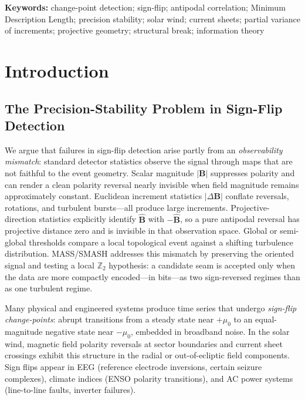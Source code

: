 \documentclass[12pt,letterpaper]{article}
\begin{document}
\textbf{Keywords:} change-point detection; sign-flip; antipodal correlation;
Minimum Description Length; precision stability; solar wind; current sheets;
partial variance of increments; projective geometry; structural break;
information theory

\clearpage

\section{Introduction}
\label{sec:intro}

\subsection{The Precision-Stability Problem in Sign-Flip Detection}

We argue that failures in sign-flip detection arise partly from an
\emph{observability mismatch}: standard detector statistics observe the
signal through maps that are not faithful to the event geometry.
Scalar magnitude $|\mathbf{B}|$ suppresses polarity and can render a clean
polarity reversal nearly invisible when field magnitude remains approximately
constant.
Euclidean increment statistics $|\Delta\mathbf{B}|$ conflate reversals,
rotations, and turbulent bursts---all produce large increments.
Projective-direction statistics explicitly identify $\hat{\mathbf{B}}$ with
$-\hat{\mathbf{B}}$, so a pure antipodal reversal has projective distance zero
and is invisible in that observation space.
Global or semi-global thresholds compare a local topological event against a
shifting turbulence distribution.
MASS/SMASH addresses this mismatch by preserving the oriented signal and
testing a local $\mathbb{Z}_2$ hypothesis: a candidate seam is accepted only
when the data are more compactly encoded---in bits---as two sign-reversed
regimes than as one turbulent regime.

Many physical and engineered systems produce time series that undergo
\emph{sign-flip change-points}: abrupt transitions from a steady state near
$+\mu_0$ to an equal-magnitude negative state near $-\mu_0$, embedded in
broadband noise.
In the solar wind, magnetic field polarity reversals at sector boundaries and
current sheet crossings exhibit this structure in the radial or out-of-ecliptic
field components.
Sign flips appear in EEG (reference electrode inversions, certain seizure
complexes), climate indices (ENSO polarity transitions), and AC power systems
(line-to-line faults, inverter failures).
\end{document}
